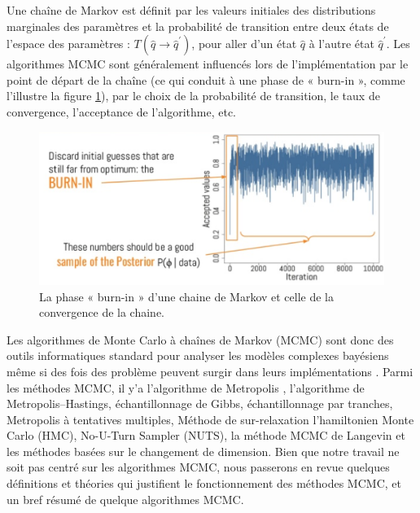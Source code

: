 Une chaîne de Markov est définit par les valeurs initiales des distributions marginales des paramètres et la probabilité de transition entre deux états de l’espace des paramètres : \(\displaystyle T(\widehat{q} \rightarrow \widehat{q}^{\prime}) \), pour aller d’un état \(\displaystyle \widehat{q} \) à l’autre état \(\displaystyle \widehat{q}^{\prime} \). Les algorithmes MCMC sont généralement influencés lors de l’implémentation par le point de départ de la chaîne (ce qui conduit à une phase de « burn-in », comme l’illustre la figure \ref{mcmc_iterations}), par le choix de la probabilité de transition, le taux de convergence, l’acceptance de l’algorithme, etc. \\

\begin{figure}[H]
	\begin{center}
		\includegraphics[width=\textwidth]{images/chapitre5/mcmc_iterations.png}
	\end{center}
	\caption{La phase « burn-in » d’une chaine de Markov et celle de la convergence de la chaine.}
	\label{mcmc_iterations}
\end{figure}

Les algorithmes de Monte Carlo à chaînes de Markov (MCMC) sont donc des outils informatiques standard pour analyser les modèles complexes bayésiens \cite{gelfand1990sampling} même si des fois des problème peuvent surgir dans leurs implémentations \cite{robert2020markov}. Parmi les méthodes MCMC, il y’a l’algorithme de Metropolis , l’algorithme de Metropolis–Hastings, échantillonnage de Gibbs, échantillonnage par tranches, Metropolis à tentatives multiples, Méthode de sur-relaxation l'hamiltonien Monte Carlo (HMC), No-U-Turn Sampler (NUTS), la méthode MCMC de Langevin et les méthodes basées sur le changement de dimension. Bien que notre travail ne soit pas centré sur les algorithmes MCMC, nous passerons en revue quelques définitions et théories qui justifient le fonctionnement des méthodes MCMC, et un bref résumé de quelque algorithmes MCMC. \\

